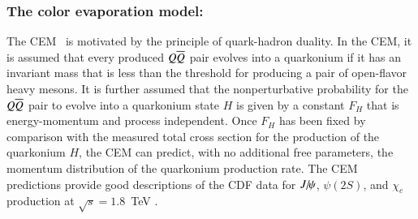 \subsubsection{The color evaporation model:}  
\label{prod_sec:CEM}

The CEM~\cite{Fritzsch:1977ay,Amundson:1995em,Amundson:1996qr}
is motivated by the principle of quark-hadron duality. In the CEM, it
is assumed that every produced $Q \overline{Q}$ pair evolves into a quarkonium
if it has an invariant mass that is less than the threshold for
producing a pair of open-flavor heavy mesons. It is further assumed that
the nonperturbative probability for the $Q \overline{Q}$ pair to evolve into a
quarkonium state $H$ is given by a constant $F_H$ that is
energy-momentum and process independent. Once $F_H$ has been fixed by
comparison with the measured total cross section for the production of
the quarkonium $H$, the CEM can predict, with no additional free
parameters, the momentum distribution of the quarkonium production rate. The
CEM predictions provide good descriptions of the CDF data for $J\hspace{-.08em}/\hspace{-.14em}\psi$,
$\psi(2S)$, and $\chi_{c}$ production at $\sqrt{s}=1.8$~TeV
\cite{Amundson:1996qr}. 


